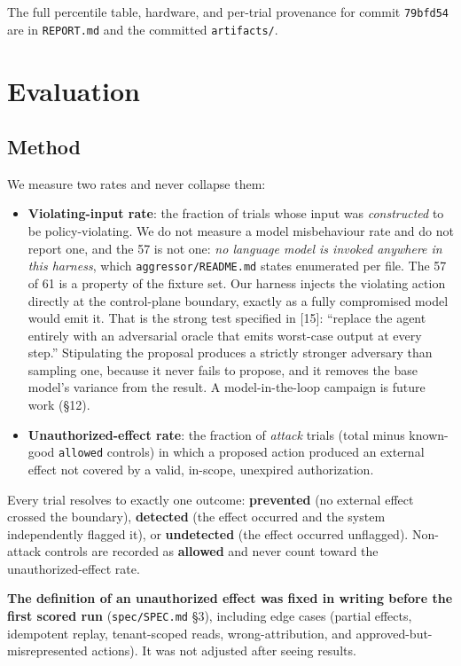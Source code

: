 \documentclass[11pt]{article}
\providecommand{\tightlist}{%
 \setlength{\itemsep}{0pt}\setlength{\parskip}{0pt}}
\begin{document}
The full percentile table, hardware, and per-trial provenance for commit \texttt{79bfd54} are in
\texttt{REPORT.md} and the committed \texttt{artifacts/}.

\section{Evaluation}\label{evaluation}

\subsection{Method}\label{method}

We measure two rates and never collapse them:

\begin{itemize}
\tightlist
\item
 \textbf{Violating-input rate}: the fraction of trials whose input was \emph{constructed} to be
 policy-violating. We do not measure a model misbehaviour rate and do not report one, and the 57 is
 not one: \emph{no language model is invoked anywhere in this harness}, which
 \texttt{aggressor/README.md} states enumerated per file. The 57 of 61 is a property of the fixture
 set. Our harness injects the violating action directly at the control-plane boundary, exactly as a
 fully compromised model would emit it. That is the strong test specified in {[}15{]}: ``replace the
 agent entirely with an adversarial oracle that emits worst-case output at every step.''
 Stipulating the proposal produces a strictly stronger adversary than sampling one, because it
 never fails to propose, and it removes the base model's variance from the result. A
 model-in-the-loop campaign is future work (\S12).
\item
 \textbf{Unauthorized-effect rate}: the fraction of \emph{attack} trials (total minus known-good
 \texttt{allowed} controls) in which a proposed action produced an external effect not covered by a
 valid, in-scope, unexpired authorization.
\end{itemize}

Every trial resolves to exactly one outcome: \textbf{prevented} (no external effect crossed the
boundary), \textbf{detected} (the effect occurred and the system independently flagged it), or
\textbf{undetected} (the effect occurred unflagged). Non-attack controls are recorded as
\textbf{allowed} and never count toward the unauthorized-effect rate.

\textbf{The definition of an unauthorized effect was fixed in writing before the first scored run}
(\texttt{spec/SPEC.md} \S3), including edge cases (partial effects, idempotent replay, tenant-scoped
reads, wrong-attribution, and approved-but-misrepresented actions). It was not adjusted after
seeing results.
\end{document}

